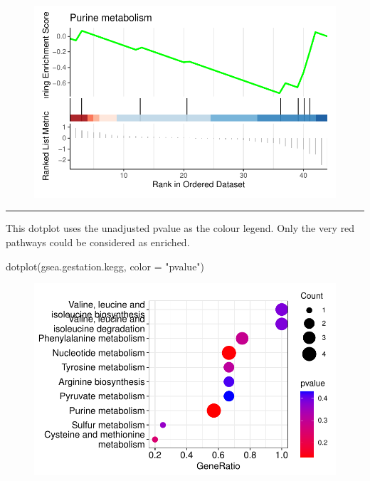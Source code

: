 \documentclass[
  24px,
  letterpaper,
  DIV=11,
  numbers=noendperiod]{scrartcl}
\newenvironment{Shaded}{\begin{snugshade}}{\end{snugshade}}
\newcommand{\AttributeTok}[1]{\textcolor[rgb]{0.40,0.45,0.13}{#1}}
\newcommand{\FunctionTok}[1]{\textcolor[rgb]{0.28,0.35,0.67}{#1}}
\newcommand{\NormalTok}[1]{\textcolor[rgb]{0.00,0.23,0.31}{#1}}
\newcommand{\StringTok}[1]{\textcolor[rgb]{0.13,0.47,0.30}{#1}}
\begin{document}
\begin{figure}[H]

{\centering \includegraphics{index_files/figure-pdf/unnamed-chunk-34-1.pdf}

}

\end{figure}

\begin{center}\rule{0.5\linewidth}{0.5pt}\end{center}

This dotplot uses the unadjusted pvalue as the colour legend. Only the
very red pathways could be considered as enriched.

\begin{Shaded}
\begin{Highlighting}[]
\FunctionTok{dotplot}\NormalTok{(gsea.gestation.kegg, }\AttributeTok{color =} \StringTok{"pvalue"}\NormalTok{)}
\end{Highlighting}
\end{Shaded}

\begin{figure}[H]

{\centering \includegraphics{index_files/figure-pdf/unnamed-chunk-35-1.pdf}

}

\end{figure}
\end{document}
